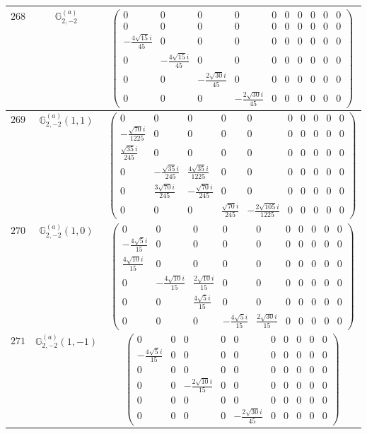 \documentclass[fleqn,8pt,landscape]{jsarticle}
\begin{document}
\begin{center}
\begin{longtable}{ccc}
$ 268 $ & $ \mathbb{G}_{2,-2}^{(a)} $ & $ \begin{pmatrix} 0 & 0 & 0 & 0 & 0 & 0 & 0 & 0 & 0 & 0 \\ 0 & 0 & 0 & 0 & 0 & 0 & 0 & 0 & 0 & 0 \\ - \frac{4 \sqrt{15} i}{45} & 0 & 0 & 0 & 0 & 0 & 0 & 0 & 0 & 0 \\ 0 & - \frac{4 \sqrt{15} i}{45} & 0 & 0 & 0 & 0 & 0 & 0 & 0 & 0 \\ 0 & 0 & - \frac{2 \sqrt{30} i}{45} & 0 & 0 & 0 & 0 & 0 & 0 & 0 \\ 0 & 0 & 0 & - \frac{2 \sqrt{30} i}{45} & 0 & 0 & 0 & 0 & 0 & 0 \end{pmatrix} $ \\ \hline
$ 269 $ & $ \mathbb{G}_{2,-2}^{(a)}(1,1) $ & $ \begin{pmatrix} 0 & 0 & 0 & 0 & 0 & 0 & 0 & 0 & 0 & 0 \\ - \frac{\sqrt{70} i}{1225} & 0 & 0 & 0 & 0 & 0 & 0 & 0 & 0 & 0 \\ \frac{\sqrt{35} i}{245} & 0 & 0 & 0 & 0 & 0 & 0 & 0 & 0 & 0 \\ 0 & - \frac{\sqrt{35} i}{245} & \frac{4 \sqrt{35} i}{1225} & 0 & 0 & 0 & 0 & 0 & 0 & 0 \\ 0 & \frac{3 \sqrt{70} i}{245} & - \frac{\sqrt{70} i}{245} & 0 & 0 & 0 & 0 & 0 & 0 & 0 \\ 0 & 0 & 0 & \frac{\sqrt{70} i}{245} & - \frac{2 \sqrt{105} i}{1225} & 0 & 0 & 0 & 0 & 0 \end{pmatrix} $ \\ \hline
$ 270 $ & $ \mathbb{G}_{2,-2}^{(a)}(1,0) $ & $ \begin{pmatrix} 0 & 0 & 0 & 0 & 0 & 0 & 0 & 0 & 0 & 0 \\ - \frac{4 \sqrt{5} i}{15} & 0 & 0 & 0 & 0 & 0 & 0 & 0 & 0 & 0 \\ \frac{4 \sqrt{10} i}{15} & 0 & 0 & 0 & 0 & 0 & 0 & 0 & 0 & 0 \\ 0 & - \frac{4 \sqrt{10} i}{15} & \frac{2 \sqrt{10} i}{15} & 0 & 0 & 0 & 0 & 0 & 0 & 0 \\ 0 & 0 & \frac{4 \sqrt{5} i}{15} & 0 & 0 & 0 & 0 & 0 & 0 & 0 \\ 0 & 0 & 0 & - \frac{4 \sqrt{5} i}{15} & \frac{2 \sqrt{30} i}{15} & 0 & 0 & 0 & 0 & 0 \end{pmatrix} $ \\ \hline
$ 271 $ & $ \mathbb{G}_{2,-2}^{(a)}(1,-1) $ & $ \begin{pmatrix} 0 & 0 & 0 & 0 & 0 & 0 & 0 & 0 & 0 & 0 \\ - \frac{4 \sqrt{5} i}{15} & 0 & 0 & 0 & 0 & 0 & 0 & 0 & 0 & 0 \\ 0 & 0 & 0 & 0 & 0 & 0 & 0 & 0 & 0 & 0 \\ 0 & 0 & - \frac{2 \sqrt{10} i}{15} & 0 & 0 & 0 & 0 & 0 & 0 & 0 \\ 0 & 0 & 0 & 0 & 0 & 0 & 0 & 0 & 0 & 0 \\ 0 & 0 & 0 & 0 & - \frac{2 \sqrt{30} i}{45} & 0 & 0 & 0 & 0 & 0 \end{pmatrix} $ \\ \hline

\end{longtable}
\end{center}
\end{document}
